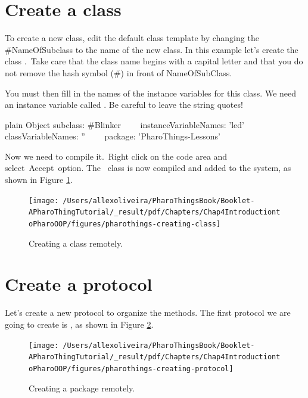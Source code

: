 \documentclass[10pt,twoside,english]{_support/latex/sbabook/sbabook}
\begin{document}
\section{Create a class}
To create a new class, edit the default class template by changing the \#NameOfSubclass to the name of the new class. In this example let's create the class . Take care that the class name begins with a capital letter and that you do not remove the hash symbol (\#) in front of NameOfSubClass. 

You must then fill in the names of the instance variables for this class. We need an instance variable called . Be careful to leave the string quotes!

\begin{displaycode}{plain}
Object subclass: #Blinker
  instanceVariableNames: 'led'
  classVariableNames: ''
  package: 'PharoThings-Lessons'
\end{displaycode}

Now we need to compile it. Right click on the code area and select Accept option. The  class is now compiled and added to the system, as shown in Figure \ref{CreatingClass}.


\begin{figure}

\begin{center}
\texttt{[image: /Users/allexoliveira/PharoThingsBook/Booklet-APharoThingTutorial/\_result/pdf/Chapters/Chap4IntroductiontoPharoOOP/figures/pharothings-creating-class]}\caption{Creating a class remotely.\label{CreatingClass}}\end{center}
\end{figure}

\section{Create a protocol}
Let's create a new protocol to organize the methods. The first protocol we are going to create is , as shown in Figure \ref{CreatingProtocol}.


\begin{figure}

\begin{center}
\texttt{[image: /Users/allexoliveira/PharoThingsBook/Booklet-APharoThingTutorial/\_result/pdf/Chapters/Chap4IntroductiontoPharoOOP/figures/pharothings-creating-protocol]}\caption{Creating a package remotely.\label{CreatingProtocol}}\end{center}
\end{figure}
\end{document}
